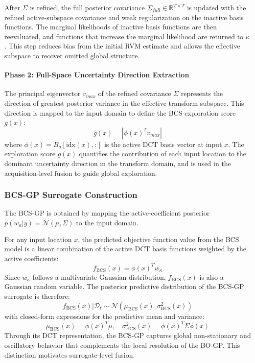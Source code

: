 \documentclass[lettersize,journal]{IEEEtran}
\begin{document}
After $\Sigma$ is refined, the full posterior covariance $\Sigma_{full} \in \mathbb{R}^{T \times T}$ is updated with the refined active-subspace covariance and weak regularization on the inactive basis functions. The marginal likelihoods of inactive basis functions are then reevaluated, and functions that increase the marginal likelihood are returned to $\kappa$. This step reduces bias from the initial RVM estimate and allows the effective subspace to recover omitted global structure.

\paragraph{Phase 2: Full-Space Uncertainty Direction Extraction}
The principal eigenvector $v_{max}$ of the refined covariance $\Sigma$ represents the direction of greatest posterior variance in the effective transform subspace. This direction is mapped to the input domain to define the BCS exploration score $g(x)$:
\begin{equation}
g(x) = \left| \phi(x)^T v_{max} \right|
\end{equation}
where $\phi(x) = B_a[\text{idx}(x), :]$ is the active DCT basis vector at input $x$. The exploration score $g(x)$ quantifies the contribution of each input location to the dominant uncertainty direction in the transform domain, and is used in the acquisition-level fusion to guide global exploration.

\subsubsection{BCS-GP Surrogate Construction}
The BCS-GP is obtained by mapping the active-coefficient posterior $p(w_\kappa | y) = \mathcal{N}(\mu, \Sigma)$ to the input domain.

For any input location $x$, the predicted objective function value from the BCS model is a linear combination of the active DCT basis functions weighted by the active coefficients:
\begin{equation}
f_{\text{BCS}}(x) = \phi(x)^T w_\kappa
\end{equation}
Since $w_\kappa$ follows a multivariate Gaussian distribution, $f_{\text{BCS}}(x)$ is also a Gaussian random variable. The posterior predictive distribution of the BCS-GP surrogate is therefore:
\begin{equation}
f_{\text{BCS}}(x) | \mathcal{D}_t \sim \mathcal{N}\left( \mu_{\text{BCS}}(x), \sigma_{\text{BCS}}^2(x) \right)
\end{equation}
with closed-form expressions for the predictive mean and variance:
\begin{equation}
\label{eq:bcs_pred}
\mu_{\text{BCS}}(x) = \phi(x)^T \mu, \quad \sigma_{\text{BCS}}^2(x) = \phi(x)^T \Sigma \phi(x)
\end{equation}
Through its DCT representation, the BCS-GP captures global non-stationary and oscillatory behavior that complements the local resolution of the BO-GP. This distinction motivates surrogate-level fusion.
\end{document}
